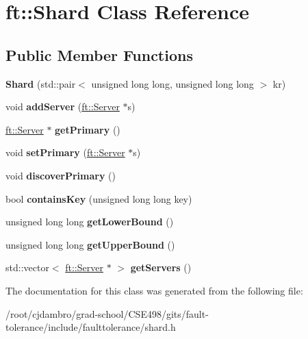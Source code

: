 \hypertarget{classft_1_1Shard}{}\section{ft\+:\+:Shard Class Reference}
\label{classft_1_1Shard}
\subsection*{Public Member Functions}
\begin{DoxyCompactItemize}
\item 
\mbox{\label{classft_1_1Shard_a12f4f5734184d8c7382cbbe66d1d26ed}} 
{\bfseries Shard} (std\+::pair$<$ unsigned long long, unsigned long long $>$ kr)
\item 
\mbox{\label{classft_1_1Shard_a2d393309209fc78d93ccf0bb3426c431}} 
void {\bfseries add\+Server} (\mbox{\hyperlink{classft_1_1Server}{ft\+::\+Server}} $\ast$s)
\item 
\mbox{\label{classft_1_1Shard_a76b726de0fb962f51f453c68ebe751e3}} 
\mbox{\hyperlink{classft_1_1Server}{ft\+::\+Server}} $\ast$ {\bfseries get\+Primary} ()
\item 
\mbox{\label{classft_1_1Shard_a9a850b8347f8be6b939f00ee91463da7}} 
void {\bfseries set\+Primary} (\mbox{\hyperlink{classft_1_1Server}{ft\+::\+Server}} $\ast$s)
\item 
\mbox{\label{classft_1_1Shard_ae21a60fcf6dd6a09b867445187873765}} 
void {\bfseries discover\+Primary} ()
\item 
\mbox{\label{classft_1_1Shard_a42e25665d6fc9d6075d0477e3470c293}} 
bool {\bfseries contains\+Key} (unsigned long long key)
\item 
\mbox{\label{classft_1_1Shard_a5c75dfb7d06ed5ff8a1ceeca7b199576}} 
unsigned long long {\bfseries get\+Lower\+Bound} ()
\item 
\mbox{\label{classft_1_1Shard_adf483639946d24a658d2e07a498e08b2}} 
unsigned long long {\bfseries get\+Upper\+Bound} ()
\item 
\mbox{\label{classft_1_1Shard_ac06fd0bca4f4254d114401ecb58d744f}} 
std\+::vector$<$ \mbox{\hyperlink{classft_1_1Server}{ft\+::\+Server}} $\ast$ $>$ {\bfseries get\+Servers} ()
\end{DoxyCompactItemize}


The documentation for this class was generated from the following file\+:\begin{DoxyCompactItemize}
\item 
/root/cjdambro/grad-\/school/\+C\+S\+E498/gits/fault-\/tolerance/include/faulttolerance/shard.\+h\end{DoxyCompactItemize}
